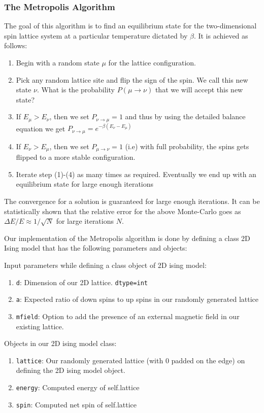 \subsubsection{The Metropolis Algorithm}
The goal of this algorithm is to find an equilibrium state for the two-dimensional spin lattice system at a particular temperature dictated by \(\beta\). It is achieved as follows:
\begin{enumerate}
    \item Begin with a random state \(\mu\) for the lattice configuration.
    \item Pick any random lattice site and flip the sign of the spin. We call this new state \(\nu\). What is the probability $P(\mu \rightarrow \nu)$ that we will accept this new state?
    \item If \(E_{\mu}>E_{\nu}\), then we set $P_{\nu \rightarrow \mu} = 1$ and thus by using the detailed balance equation we get $P_{\nu \rightarrow \mu} =e^{-\beta(E_{\nu}-E_{\mu})}$
    \item If $E_{\nu}>E_{\mu}$, then we set $P_{\mu \rightarrow \nu} = 1$ (i.e) with full probability, the spins gets flipped to a more stable configuration.
    \item Iterate step (1)-(4) as many times as required. Eventually we end up with an equilibrium state for large enough iterations
\end{enumerate}

The convergence for a solution is guaranteed for large enough iterations. It can be statistically shown that the relative error for the above Monte-Carlo goes as $\Delta E/E \approx 1/\sqrt{N}$ for large iterations $N$.

Our implementation of the Metropolis algorithm is done by defining a class 2D Ising model that has the following parameters and objects:

Input parameters while defining a class object of 2D ising model:
\begin{enumerate}
    \item \texttt{d}: Dimension of our 2D lattice. \texttt{dtype=int}
    \item \texttt{a}: Expected ratio of down spins to up spins in our randomly generated lattice
    \item \texttt{mfield}: Option to add the presence of an external magnetic field in our existing lattice.
\end{enumerate}

Objects in our 2D ising model class:
\begin{enumerate}
    \item \texttt{lattice}: Our randomly generated lattice (with 0 padded on the edge) on defining the 2D ising model object.
    \item \texttt{energy}: Computed energy of self.lattice
    \item \texttt{spin}: Computed net spin of self.lattice
\end{enumerate}

